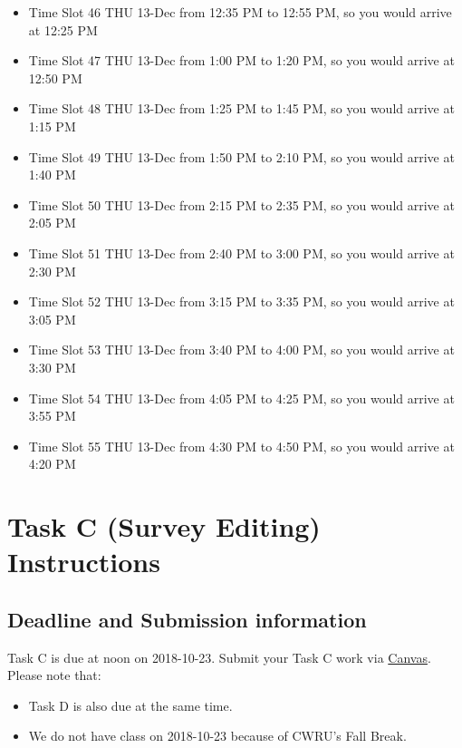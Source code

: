 \documentclass[]{book}
\providecommand{\tightlist}{%
  \setlength{\itemsep}{0pt}\setlength{\parskip}{0pt}}
\theoremstyle{definition}
\theoremstyle{definition}
\theoremstyle{definition}
\theoremstyle{remark}
\begin{document}
\begin{itemize}
\tightlist
\item
  Time Slot 46 THU 13-Dec from 12:35 PM to 12:55 PM, so you would arrive
  at 12:25 PM
\item
  Time Slot 47 THU 13-Dec from 1:00 PM to 1:20 PM, so you would arrive
  at 12:50 PM
\item
  Time Slot 48 THU 13-Dec from 1:25 PM to 1:45 PM, so you would arrive
  at 1:15 PM
\item
  Time Slot 49 THU 13-Dec from 1:50 PM to 2:10 PM, so you would arrive
  at 1:40 PM
\item
  Time Slot 50 THU 13-Dec from 2:15 PM to 2:35 PM, so you would arrive
  at 2:05 PM
\item
  Time Slot 51 THU 13-Dec from 2:40 PM to 3:00 PM, so you would arrive
  at 2:30 PM
\item
  Time Slot 52 THU 13-Dec from 3:15 PM to 3:35 PM, so you would arrive
  at 3:05 PM
\item
  Time Slot 53 THU 13-Dec from 3:40 PM to 4:00 PM, so you would arrive
  at 3:30 PM
\item
  Time Slot 54 THU 13-Dec from 4:05 PM to 4:25 PM, so you would arrive
  at 3:55 PM
\item
  Time Slot 55 THU 13-Dec from 4:30 PM to 4:50 PM, so you would arrive
  at 4:20 PM
\end{itemize}

\hypertarget{taskC}{%
\chapter{Task C (Survey Editing) Instructions}\label{taskC}}

\hypertarget{deadline-and-submission-information-2}{%
\section{Deadline and Submission
information}\label{deadline-and-submission-information-2}}

Task C is due at noon on 2018-10-23. Submit your Task C work via
\href{https://canvas.case.edu/}{Canvas}. Please note that:

\begin{itemize}
\tightlist
\item
  Task D is also due at the same time.
\item
  We do not have class on 2018-10-23 because of CWRU's Fall Break.
\end{itemize}
\end{document}
